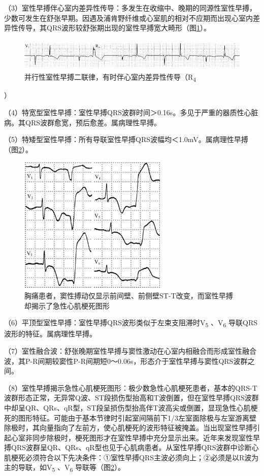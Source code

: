 （3）室性早搏伴心室内差异性传导：多发生在收缩中、晚期的同源性室性早搏，少数可发生在舒张早期。因遇及浦肯野纤维或心室肌的相对不应期而出现心室内差异性传导，其QRS波形较舒张期出现的室性早搏宽大畸形（图\ref{fig11-22}）。

\begin{figure}[!htbp]
 \centering
 \includegraphics[width=5.58333in,height=0.61458in]{./images/Image00182.jpg}
 \captionsetup{justification=centering}
 \caption{并行性室性早搏二联律，有时伴心室内差异性传导（R\textsubscript{4}}
 \label{fig11-22}
  \end{figure} 
）

（4）特宽型室性早搏：室性早搏QRS波群时间＞0.16s。多见于严重的器质性心脏病。其QRS波群愈宽，预后愈差。属病理性早搏。

（5）特矮型室性早搏：所有导联室性早搏QRS波幅均＜1.0mV。属病理性早搏（图\ref{fig11-23}）。

\begin{figure}[!htbp]
 \centering
 \includegraphics[width=2.78125in,height=2.60417in]{./images/Image00183.jpg}
 \captionsetup{justification=centering}
 \caption{胸痛患者，窦性搏动仅显示前间壁、前侧壁ST-T改变，而室性早搏却揭示了急性心肌梗死图形}
 \label{fig11-23}
  \end{figure} 

（6）平顶型室性早搏：室性早搏QRS波形类似于左束支阻滞时V\textsubscript{5}
、V\textsubscript{6} 导联QRS波形的特征。属病理性早搏。

（7）室性融合波：舒张晚期室性早搏与窦性激动在心室内相融合而形成室性融合波，其P-R间期较窦性P-R间期短0～0.06s，形态介于室性早搏与窦性QRS波群之间。

（8）室性早搏揭示急性心肌梗死图形：极少数急性心肌梗死患者，基本的QRS-T波群形态正常，无异常Q波、ST段损伤型抬高和T波倒置，但在室性早搏QRS波群中却呈QR、QRs、qR型，ST段呈损伤型抬高伴T波高尖或倒置，显现急性心肌梗死的图形特征。可能由于基本节律时引起室间隔前下1/3左室面除极与左室游离壁除极时，其向量指向了左前方，使心肌梗死的波形特征被掩盖。当出现室性早搏引起心室非同步除极时，梗死图形才在室性早搏中充分显示出来。近年来发现室性早搏QRS波群呈QR、QRs、qR型也见于心肌病患者。从室性早搏QRS波群中诊断心肌梗死必须符合以下先决条件：①室性早搏QRS主波必须向上；②必须是以R波为主的导联，如V\textsubscript{5}
、V\textsubscript{6} 导联等（图\ref{fig11-23}）。

